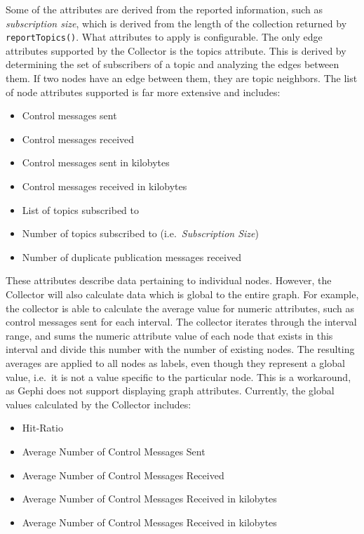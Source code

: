 Some of the attributes are derived from the reported information, such
as \emph{subscription size}, which is derived from the length of the
collection returned by \texttt{reportTopics()}. What attributes to apply
is configurable. The only edge attributes supported by the Collector is
the topics attribute. This is derived by determining the set of
subscribers of a topic and analyzing the edges between them. If two
nodes have an edge between them, they are topic neighbors. The list of
node attributes supported is far more extensive and includes:

\begin{itemize}
    \item Control messages sent
    \item Control messages received
    \item Control messages sent in kilobytes
    \item Control messages received in kilobytes
    \item List of topics subscribed to
    \item Number of topics subscribed to (i.e.\ \emph{Subscription Size})
    \item Number of duplicate publication messages received
\end{itemize}

These attributes describe data pertaining to individual nodes. However,
the Collector will also calculate data which is global to the entire
graph. For example, the collector is able to calculate the average value
for numeric attributes, such as control messages sent for each interval.
The collector iterates through the interval range, and sums the numeric
attribute value of each node that exists in this interval and divide
this number with the number of existing nodes. The resulting averages
are applied to all nodes as labels, even though they represent a global
value, i.e.\ it is not a value specific to the particular node. This is a
workaround, as Gephi does not support displaying graph attributes.
Currently, the global values calculated by the Collector includes:

\begin{itemize}
    \item Hit-Ratio
    \item Average Number of Control Messages Sent
    \item Average Number of Control Messages Received
    \item Average Number of Control Messages Received in kilobytes
    \item Average Number of Control Messages Received in kilobytes
\end{itemize}

